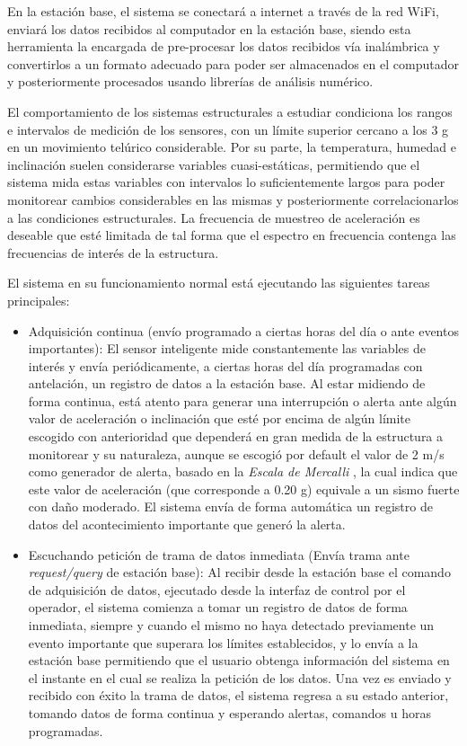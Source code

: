 En la estación base, el sistema se conectará a internet a través de la red WiFi, enviará los datos recibidos al computador en la estación base, siendo esta herramienta la encargada de pre-procesar los datos recibidos vía inalámbrica y convertirlos a un formato adecuado para poder ser almacenados en el computador y posteriormente procesados usando librerías de análisis numérico.

El comportamiento de los sistemas estructurales a estudiar condiciona los rangos e intervalos de medición de los sensores, con un límite superior cercano a los 3 g en un movimiento telúrico considerable. Por su parte, la temperatura, humedad e inclinación suelen considerarse variables cuasi-estáticas, permitiendo que el sistema mida estas variables con intervalos lo suficientemente largos para poder monitorear cambios considerables en las mismas y posteriormente correlacionarlos a las condiciones estructurales. La frecuencia de muestreo de aceleración es deseable que esté limitada de tal forma que el espectro en frecuencia contenga las frecuencias de interés de la estructura.

El sistema en su funcionamiento normal está ejecutando las siguientes tareas principales:

\begin{itemize}
    \item Adquisición continua (envío programado a ciertas horas del día o ante eventos importantes): El sensor inteligente mide constantemente las variables de interés y envía periódicamente, a ciertas horas del día programadas con antelación, un registro de datos a la estación base. Al estar midiendo de forma continua, está atento para generar una interrupción o alerta ante algún valor de aceleración o inclinación que esté por encima de algún límite escogido con anterioridad que dependerá en gran medida de la estructura a monitorear y su naturaleza, aunque se escogió por default el valor de 2 m/s como generador de alerta, basado en la \textit{Escala de Mercalli} \citep{mercalli}, la cual indica que este valor de aceleración (que corresponde a 0.20 g) equivale a un sismo fuerte con daño moderado. El sistema envía de forma automática un registro de datos del acontecimiento importante que generó la alerta.
	\item Escuchando petición de trama de datos inmediata (Envía trama ante \textit{request/query} de estación base): Al recibir desde la estación base el comando de adquisición de datos, ejecutado desde la interfaz de control por el operador, el sistema comienza a tomar un registro de datos de forma inmediata, siempre y cuando el mismo no haya detectado previamente un evento importante que superara los límites establecidos, y lo envía a la estación base permitiendo que el usuario obtenga información del sistema en el instante en el cual se realiza la petición de los datos. Una vez es enviado y recibido con éxito la trama de datos, el sistema regresa a su estado anterior, tomando datos de forma continua y esperando alertas, comandos u horas programadas.

\end{itemize}

